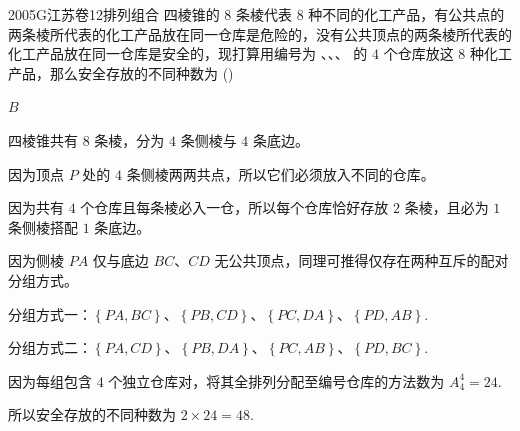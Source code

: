 
\begin{problem}{2005}{G}{江苏卷}{12}{排列组合}
四棱锥的 $8$ 条棱代表 $8$ 种不同的化工产品，有公共点的两条棱所代表的化工产品放在同一仓库是危险的，没有公共顶点的两条棱所代表的化工产品放在同一仓库是安全的，现打算用编号为 、、、 的 $4$ 个仓库放这 $8$ 种化工产品，那么安全存放的不同种数为 (\hspace{1cm})
\begin{choices}
\end{choices}
\end{problem}

\begin{answer}
$B$
\end{answer}

\begin{solutions}
四棱锥共有 $8$ 条棱，分为 $4$ 条侧棱与 $4$ 条底边。

因为顶点 $P$ 处的 $4$ 条侧棱两两共点，所以它们必须放入不同的仓库。

因为共有 $4$ 个仓库且每条棱必入一仓，所以每个仓库恰好存放 $2$ 条棱，且必为 $1$ 条侧棱搭配 $1$ 条底边。

因为侧棱 $PA$ 仅与底边 $BC$、$CD$ 无公共顶点，同理可推得仅存在两种互斥的配对分组方式。

分组方式一：$\left\{ PA, BC \right\}$、$\left\{ PB, CD \right\}$、$\left\{ PC, DA \right\}$、$\left\{ PD, AB \right\}$.

分组方式二：$\left\{ PA, CD \right\}$、$\left\{ PB, DA \right\}$、$\left\{ PC, AB \right\}$、$\left\{ PD, BC \right\}$.

因为每组包含 $4$ 个独立仓库对，将其全排列分配至编号仓库的方法数为 $A_4^4 = 24$.

所以安全存放的不同种数为 $2 \times 24 = 48$.

\end{solutions}